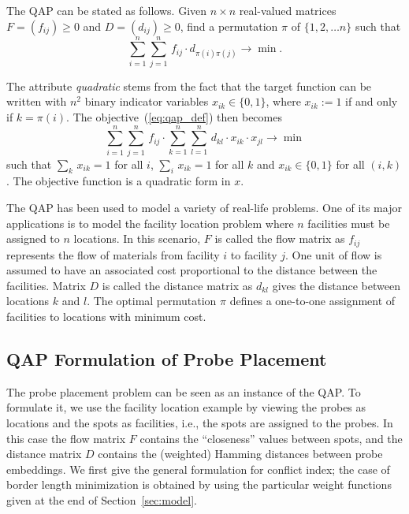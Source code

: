 \documentclass{bioinfo}
\begin{document}
The QAP can be stated as follows. Given $n \times n$ real-valued matrices $F =
(f_{ij})\geq 0$ and $D = (d_{ij})\geq 0$, find a permutation $\pi$ of $\{1, 2,
\ldots n\}$ such that
\begin{equation}\label{eq:qap_def}
  \sum_{i=1}^{n} \sum_{j=1}^{n}\,  f_{ij} \cdot d_{\pi(i)\pi(j)} \to \min.
\end{equation}

The attribute \emph{quadratic} stems from the fact that the target function
can be written with $n^2$ binary indicator variables $x_{ik}\in\{0,1\}$, where
$x_{ik}:=1$ if and only if $k=\pi(i)$. The objective~(\ref{eq:qap_def}) then
becomes
\begin{equation}\label{eq:qap_x}
  \sum_{i=1}^{n} \sum_{j=1}^{n}\,  f_{ij} \cdot 
  \sum_{k=1}^{n} \sum_{l=1}^{n}\,  d_{kl} \cdot x_{ik}\cdot x_{jl}
  \to \min
\end{equation}
such that $\sum_{k}\, x_{ik}=1$ for all $i$, $\sum_{i}\, x_{ik}=1$ for all $k$
and $x_{ik}\in\{0,1\}$ for all $(i,k)$. The objective function is a quadratic
form in $x$.

The QAP has been used to model a variety of real-life problems. One of its
major applications is to model the facility location problem where $n$
facilities must be assigned to $n$ locations. In this scenario, $F$ is called
the flow matrix as $f_{ij}$ represents the flow of materials from facility $i$
to facility $j$. One unit of flow is assumed to have an associated cost
proportional to the distance between the facilities. Matrix $D$ is called the
distance matrix as $d_{kl}$ gives the distance between locations $k$ and $l$.
The optimal permutation $\pi$ defines a one-to-one assignment of facilities to
locations with minimum cost.

\subsection{QAP Formulation of Probe Placement}
\label{sec:qap_form}

The probe placement problem can be seen as an instance of the QAP. To
formulate it, we use the facility location example by viewing the probes as
locations and the spots as facilities, i.e., the spots are assigned to the
probes. In this case the flow matrix $F$ contains the ``closeness'' values
between spots, and the distance matrix $D$ contains the (weighted) Hamming
distances between probe embeddings.  We first give the general formulation for
conflict index; the case of border length minimization is obtained by using
the particular weight functions given at the end of
Section~\ref{sec:model}.
\end{document}
